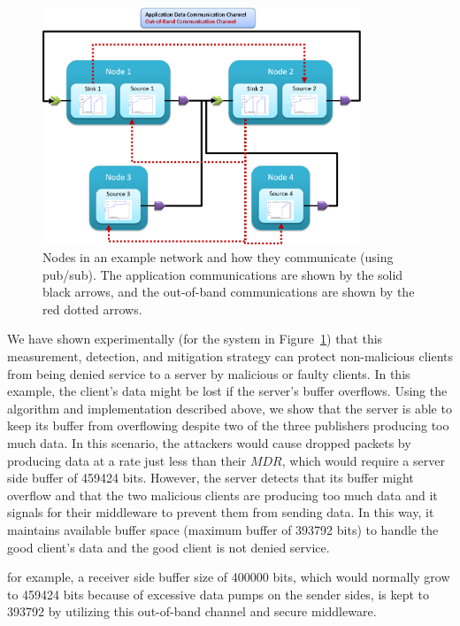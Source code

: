 \begin{figure}[ht!]
  \centering
  \includegraphics[width=0.85\textwidth]{../doc/src/images/results/example_setup.png}
  \caption{Nodes in an example network and how they communicate (using
    pub/sub).  The application communications are shown by the solid
    black arrows, and the out-of-band communications are shown by the
    red dotted arrows. }
  \label{fig:ddos}
\end{figure}

We have shown experimentally (for the system in Figure~\ref{fig:ddos})
that this measurement, detection, and mitigation strategy can protect
non-malicious clients from being denied service to a server by
malicious or faulty clients.  In this example, the client's data might
be lost if the server's buffer overflows.  Using the algorithm and
implementation described above, we show that the server is able to
keep its buffer from overflowing despite two of the three publishers
producing too much data.  In this scenario, the attackers would cause
dropped packets by producing data at a rate just less than their
$MDR$, which would require a server side buffer of 459424 bits.
However, the server detects that its buffer might overflow and that
the two malicious clients are producing too much data and it signals
for their middleware to prevent them from sending data.  In this way,
it maintains available buffer space (maximum buffer of 393792 bits) to
handle the good client's data and the good client is not denied
service.

\iffalse

for example, a receiver side buffer size of 400000 bits, which
would normally grow to 459424 bits because of excessive data pumps on
the sender sides, is kept to 393792 by utilizing this out-of-band
channel and secure middleware.

